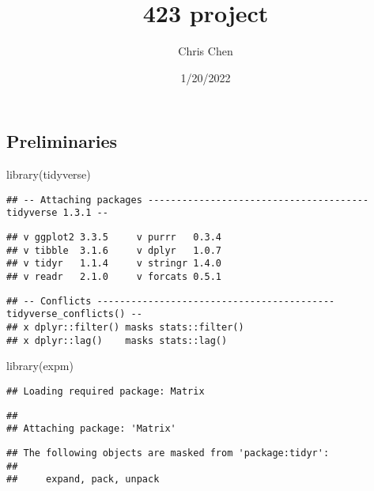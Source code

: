 \documentclass[
]{article}
\title{423 project}
\author{Chris Chen}
\date{1/20/2022}
\newenvironment{Shaded}{\begin{snugshade}}{\end{snugshade}}
\newcommand{\FunctionTok}[1]{\textcolor[rgb]{0.00,0.00,0.00}{#1}}
\newcommand{\NormalTok}[1]{#1}
\begin{document}
\maketitle

\hypertarget{preliminaries}{%
\subsection{Preliminaries}\label{preliminaries}}

\begin{Shaded}
\begin{Highlighting}[]
\FunctionTok{library}\NormalTok{(tidyverse)}
\end{Highlighting}
\end{Shaded}

\begin{verbatim}
## -- Attaching packages --------------------------------------- tidyverse 1.3.1 --
\end{verbatim}

\begin{verbatim}
## v ggplot2 3.3.5     v purrr   0.3.4
## v tibble  3.1.6     v dplyr   1.0.7
## v tidyr   1.1.4     v stringr 1.4.0
## v readr   2.1.0     v forcats 0.5.1
\end{verbatim}

\begin{verbatim}
## -- Conflicts ------------------------------------------ tidyverse_conflicts() --
## x dplyr::filter() masks stats::filter()
## x dplyr::lag()    masks stats::lag()
\end{verbatim}

\begin{Shaded}
\begin{Highlighting}[]
\FunctionTok{library}\NormalTok{(expm)}
\end{Highlighting}
\end{Shaded}

\begin{verbatim}
## Loading required package: Matrix
\end{verbatim}

\begin{verbatim}
## 
## Attaching package: 'Matrix'
\end{verbatim}

\begin{verbatim}
## The following objects are masked from 'package:tidyr':
## 
##     expand, pack, unpack
\end{verbatim}
\end{document}
